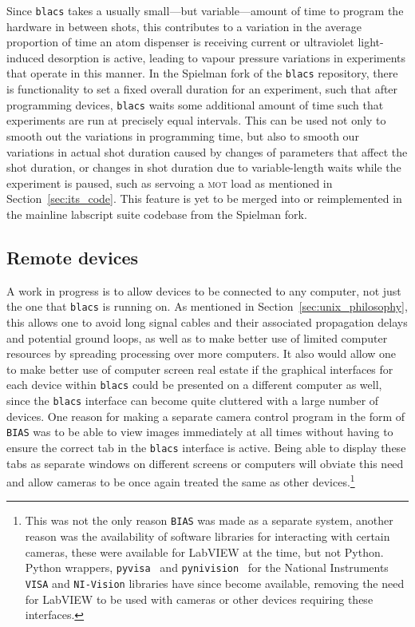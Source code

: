 Since \texttt{blacs} takes a usually small---but variable---amount of time to program the hardware in between shots, this contributes to a variation in the average proportion of time an atom dispenser is receiving current or ultraviolet light-induced desorption is active, leading to vapour pressure variations in experiments that operate in this manner. In the Spielman fork of the \texttt{blacs} repository, there is functionality to set a fixed overall duration for an experiment, such that after programming devices, \texttt{blacs} waits some additional amount of time such that experiments are run at precisely equal intervals. This can be used not only to smooth out the variations in programming time, but also to smooth our variations in actual shot duration caused by changes of parameters that affect the shot duration, or changes in shot duration due to variable-length waits while the experiment is paused, such as servoing a \textsc{mot} load as mentioned in Section~\ref{sec:its_code}. This feature is yet to be merged into or reimplemented in the mainline labscript suite codebase from the Spielman fork.

\subsection{Remote devices}

A work in progress is to allow devices to be connected to any computer, not just the one that \texttt{blacs} is running on. As mentioned in Section~\ref{sec:unix_philosophy}, this allows one to avoid long signal cables and their associated propagation delays and potential ground loops, as well as to make better use of limited computer resources by spreading processing over more computers. It also would allow one to make better use of computer screen real estate if the graphical interfaces for each device within \texttt{blacs} could be presented on a different computer as well, since the \texttt{blacs} interface can become quite cluttered with a large number of devices. One reason for making a separate camera control program in the form of \texttt{BIAS} was to be able to view images immediately at all times without having to ensure the correct tab in the \texttt{blacs} interface is active. Being able to display these tabs as separate windows on different screens or computers will obviate this need and allow cameras to be once again treated the same as other devices.\footnote{This was not the only reason \texttt{BIAS} was made as a separate system, another reason was the availability of software libraries for interacting with certain cameras, these were available for LabVIEW at the time, but not Python. Python wrappers, \texttt{pyvisa}~\cite{torsten_bronger_pyvisa_2018} and \texttt{pynivision}~\cite{peter_johnson_frc_team_294_pynivision_2015} for the National Instruments \texttt{VISA} and \texttt{NI-Vision} libraries have since become available, removing the need for LabVIEW to be used with cameras or other devices requiring these interfaces.}

